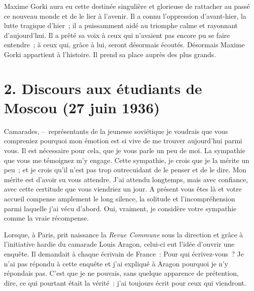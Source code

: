 \documentclass[french,twoside]{book} %
\begin{document}
Maxime Gorki aura eu cette destinée singulière et glorieuse de rattacher au passé ce nouveau monde et de le lier à l’avenir. Il a connu l’oppression d’avant-hier, la lutte tragique d’hier ; il a puissamment aidé au triomphe calme et rayonnant d’aujourd’hui. Il a prêté sa voix à ceux qui n’avaient pas encore pu se faire entendre ; à ceux qui, grâce à lui, seront désormais écoutés. Désormais Maxime Gorki appartient à l’histoire. Il prend sa place auprès des plus grands.

\section[{2. Discours aux étudiants de Moscou (27 juin 1936)}]{2. Discours aux étudiants de Moscou (27 juin 1936)}

\noindent Camarades, – représentants de la jeunesse soviétique je voudrais que vous compreniez pourquoi mon émotion est si vive de me trouver aujourd’hui parmi vous. Il est nécessaire pour cela, que je vous parle un peu de moi. La sympathie que vous me témoignez m’y engage. Cette sympathie, je crois que je la mérite un peu ; et je crois qu’il n’est pas trop outrecuidant de le penser et de le dire. Mon mérite est d’avoir su vous attendre. J’ai attendu longtemps, mais avec confiance, avec cette certitude que vous viendriez un jour. A présent vous êtes là et votre accueil compense amplement le long silence, la solitude et l’incompréhension parmi laquelle j’ai vécu d’abord. Oui, vraiment, je considère votre sympathie comme la vraie récompense.\par
Lorsque, à Paris, prit naissance la \emph{Revue Commune} sous la direction et grâce à l’initiative hardie du camarade Louis Aragon, celui-ci eut l’idée d’ouvrir une enquête. Il demandait à chaque écrivain de France : Pour qui écrivez-vous ? Je n’ai pas répondu à cette enquête et j’ai expliqué à Aragon pourquoi je n’y répondais pas. C’est que je ne pouvais, sans quelque apparence de prétention, dire, ce qui pourtant était la vérité : j’ai toujours écrit pour ceux qui viendront.\par
\end{document}
